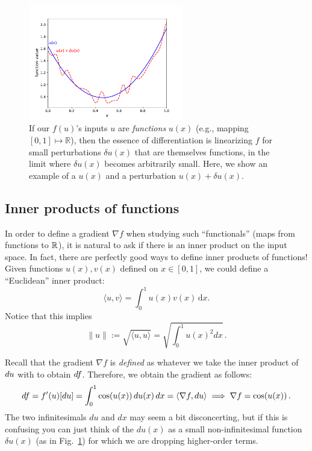 \begin{figure}
    \centering
    \includegraphics[width=0.6\textwidth]{figures/du}
    \caption{If our $f(u)$'s inputs $u$ are \emph{functions} $u(x)$ (e.g., mapping $[0,1] \mapsto \mathbb{R}$), then the essence of differentiation is linearizing $f$ for small perturbations $\delta u(x)$ that are themselves functions, in the limit where $\delta u(x)$ becomes arbitrarily small.  Here, we show an example of a $u(x)$ and a perturbation $u(x)+\delta u(x)$.}
    \label{fig:du}
\end{figure}

\subsection{Inner products of functions}

In order to define a gradient $\nabla f$ when studying such ``functionals'' (maps from functions to $\mathbb R$), it is natural to ask if there is an inner product on the input space. In fact, there are perfectly good ways to define inner products of functions! Given functions $u(x), v(x)$ defined on $x\in [0,1]$, we could define a ``Euclidean'' inner product:
\[
\langle u, v \rangle = \int_0^1 u(x) v(x) \,\mathrm dx.
\]
Notice that this implies 
\[
\lVert u \rVert := \sqrt{\langle u, u \rangle} = \sqrt{\int_0^1 u(x)^2 dx} \, .
\]

Recall that the gradient $\nabla f$ is \emph{defined} as whatever we take the inner product of $d u$ with to obtain $d f$. 
 Therefore, we obtain the gradient as follows: 
\[
d f = f'(u)[d u]  = \int_0^1 \cos(u(x)) \,d u(x)\, d x  = \langle \nabla f, d u \rangle \implies \nabla f = \cos (u(x)) \, .
\]
The two infinitesimals $du$ and $dx$ may seem a bit disconcerting, but if this is confusing you can just think of the $du(x)$ as a small non-infinitesimal function $\delta u(x)$ (as in Fig.~\ref{fig:du}) for which we are dropping higher-order terms.

